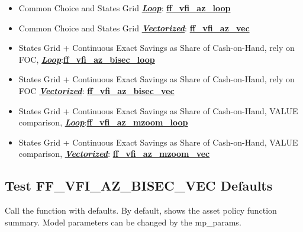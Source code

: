 \documentclass[
]{book}
\begin{document}
\begin{itemize}
\item
  Common Choice and States Grid \underline{\textbf{\emph{Loop}}}:
  \href{https://github.com/FanWangEcon/MEconTools/blob/master/MEconTools/vfi/ff_vfi_az_loop.m}{\textbf{ff\_vfi\_az\_loop}}
\item
  Common Choice and States Grid \underline{\textbf{\emph{Vectorized}}}:
  \href{https://github.com/FanWangEcon/MEconTools/blob/master/MEconTools/vfi/ff_vfi_az_vec.m}{\textbf{ff\_vfi\_az\_vec}}
\item
  States Grid + Continuous Exact Savings as Share of Cash-on-Hand,
  rely on FOC, \underline{\textbf{\emph{Loop}}}:\href{https://github.com/FanWangEcon/MEconTools/blob/master/MEconTools/vfi/ff_vfi_az_bisec_loop.m}{\textbf{ff\_vfi\_az\_bisec\_loop}}
\item
  States Grid + Continuous Exact Savings as Share of Cash-on-Hand,
  rely on FOC \underline{\textbf{\emph{Vectorized}}}:
  \href{https://github.com/FanWangEcon/MEconTools/blob/master/MEconTools/vfi/ff_vfi_az_bisec_vec.m}{\textbf{ff\_vfi\_az\_bisec\_vec}}
\item
  States Grid + Continuous Exact Savings as Share of Cash-on-Hand,
  VALUE comparison, \underline{\textbf{\emph{Loop}}}:\href{https://github.com/FanWangEcon/MEconTools/blob/master/MEconTools/vfi/ff_vfi_az_mzoom_loop.m}{\textbf{ff\_vfi\_az\_mzoom\_loop}}
\item
  States Grid + Continuous Exact Savings as Share of Cash-on-Hand,
  VALUE comparison, \underline{\textbf{\emph{Vectorized}}}:
  \href{https://github.com/FanWangEcon/MEconTools/blob/master/MEconTools/vfi/ff_vfi_az_mzoom_vec.m}{\textbf{ff\_vfi\_az\_mzoom\_vec}}
\end{itemize}

\hypertarget{test-ff_vfi_az_bisec_vec-defaults}{%
\subsection{Test FF\_VFI\_AZ\_BISEC\_VEC Defaults}\label{test-ff_vfi_az_bisec_vec-defaults}}

Call the function with defaults. By default, shows the asset policy
function summary. Model parameters can be changed by the mp\_params.
\end{document}
